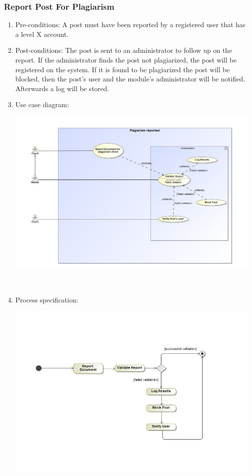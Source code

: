\documentclass[hidelinks, 12pt, oneside]{article}
\begin{document}
\subsubsection{Report Post For Plagiarism}
\begin{enumerate}
 \item Pre-conditions: A post must have been reported by a registered user that has a level X account. 
 
 \item Post-conditions: The post is sent to an administrator to follow up on the report. If the administrator finds the post not plagiarized, the post will be registered on the system. If it is found to be plagiarized the post will be blocked, then the post's user and the module's administrator will be notified. Afterwards a log will be stored. 

  \item Use case diagram:\\
  \centerline{\includegraphics[scale=0.4]{plagiarismReportUC}}\\
   \item Process specification:\\
 \centerline{\includegraphics[scale=0.35]{plagiarismReportAD}} 
\end{enumerate}
\end{document}
